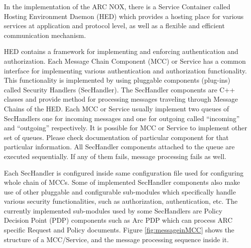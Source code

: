 \documentclass{article}                            %
\begin{document}
In the implementation of the ARC NOX, there is a Service Container called Hosting Environment Daemon (HED) \cite{hed} which provides a hosting place for various services at application and protocol level, as well as a flexible and efficient communication mechanism.

HED contains a framework for implementing and enforcing authentication and authorization. Each Message Chain Component (MCC) or Service has a common interface for implementing various authentication and authorization functionality. This functionality is implemented by using pluggable components (plug-ins) called Security Handlers (SecHandler). The SecHandler components are C++ classes and provide method for processing messages traveling through Message Chains of the HED. Each MCC or Service  usually implement two queues of SecHandlers one for incoming messages and one for outgoing called ``incoming'' and ``outgoing'' respectively. It is possible for MCC or Service to implement other set of queues. Please check documentation of particular component for that particular information. All SecHandler components attached to the queue are executed sequentially. If any of them fails, message processing fails as well.

Each SecHandler is configured inside same configuration file used for configuring whole chain of MCCs. Some of implemented SecHandler components also make use of other pluggable and configurable sub-modules which specifically handle various security functionalities, such as authorization, authentication, etc. The currently implemented sub-modules used by some SecHandlers are Policy Decision Point (PDP) components such as Arc PDP which can process ARC specific Request and Policy documents. Figure \ref{fig:messageinMCC} shows the structure of a MCC/Service, and the message processing sequence inside it.
\end{document}
